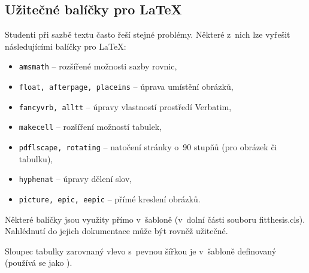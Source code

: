 \subsection*{Užitečné balíčky pro \LaTeX}

Studenti při sazbě textu často řeší stejné problémy. Některé z~nich lze vyřešit následujícími balíčky pro \LaTeX:

\begin{itemize}
  \item \verb|amsmath| -- rozšířené možnosti sazby rovnic,
  \item \verb|float, afterpage, placeins| -- úprava umístění obrázků,
  \item \verb|fancyvrb, alltt| -- úpravy vlastností prostředí Verbatim, 
  \item \verb|makecell| -- rozšíření možností tabulek,
  \item \verb|pdflscape, rotating| -- natočení stránky o~90 stupňů (pro obrázek či tabulku),
  \item \verb|hyphenat| -- úpravy dělení slov,
  \item \verb|picture, epic, eepic| -- přímé kreslení obrázků.
\end{itemize}

Některé balíčky jsou využity přímo v~šabloně (v~dolní části souboru fitthesis.cls). Nahlédnutí do jejich dokumentace může být rovněž užitečné.

Sloupec tabulky zarovnaný vlevo s~pevnou šířkou je v~šabloně definovaný  (používá se jako ).

